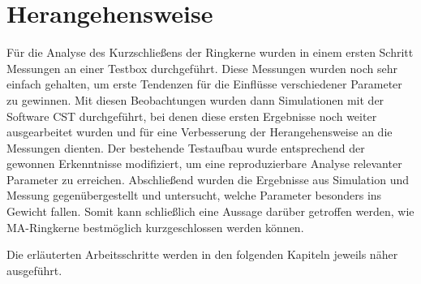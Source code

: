 \section{Herangehensweise}
Für die Analyse des Kurzschließens der Ringkerne wurden in einem ersten Schritt Messungen an einer Testbox durchgeführt. Diese Messungen wurden noch sehr einfach gehalten, um erste Tendenzen für die Einflüsse verschiedener Parameter zu gewinnen. Mit diesen Beobachtungen wurden dann Simulationen mit der Software CST durchgeführt, bei denen diese ersten Ergebnisse noch weiter ausgearbeitet wurden und für eine Verbesserung der Herangehensweise an die Messungen dienten.
Der bestehende Testaufbau wurde entsprechend der gewonnen Erkenntnisse modifiziert, um eine reproduzierbare Analyse relevanter Parameter zu erreichen.
Abschließend wurden die Ergebnisse aus Simulation und Messung gegenübergestellt und untersucht, welche Parameter besonders ins Gewicht fallen. Somit kann schließlich eine Aussage darüber getroffen werden, wie MA-Ringkerne bestmöglich kurzgeschlossen werden können.
\par
Die erläuterten Arbeitsschritte werden in den folgenden Kapiteln jeweils näher ausgeführt.